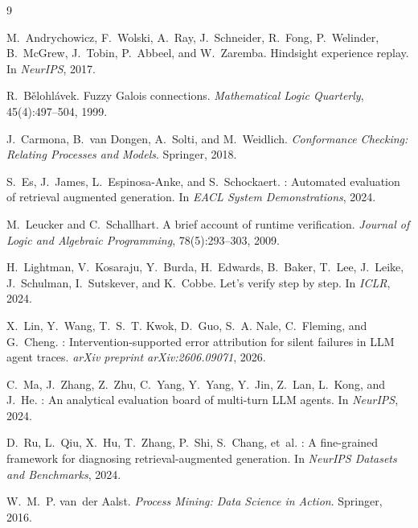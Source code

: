 \documentclass{article}
\begin{document}
{\small
\begin{thebibliography}{9}

M.~Andrychowicz, F.~Wolski, A.~Ray, J.~Schneider, R.~Fong, P.~Welinder, B.~McGrew, J.~Tobin, P.~Abbeel, and W.~Zaremba.
\newblock Hindsight experience replay.
\newblock In \emph{NeurIPS}, 2017.

R.~B\v{e}lohl\'avek.
\newblock Fuzzy Galois connections.
\newblock \emph{Mathematical Logic Quarterly}, 45(4):497--504, 1999.

J.~Carmona, B.~van Dongen, A.~Solti, and M.~Weidlich.
\newblock \emph{Conformance Checking: Relating Processes and Models}.
\newblock Springer, 2018.

S.~Es, J.~James, L.~Espinosa-Anke, and S.~Schockaert.
: Automated evaluation of retrieval augmented generation.
\newblock In \emph{EACL System Demonstrations}, 2024.

M.~Leucker and C.~Schallhart.
\newblock A brief account of runtime verification.
\newblock \emph{Journal of Logic and Algebraic Programming}, 78(5):293--303, 2009.

H.~Lightman, V.~Kosaraju, Y.~Burda, H.~Edwards, B.~Baker, T.~Lee, J.~Leike, J.~Schulman, I.~Sutskever, and K.~Cobbe.
\newblock Let's verify step by step.
\newblock In \emph{ICLR}, 2024.

X.~Lin, Y.~Wang, T.~S.~T. Kwok, D.~Guo, S.~A. Nale, C.~Fleming, and G.~Cheng.
: Intervention-supported error attribution for silent failures in {LLM} agent traces.
\newblock \emph{arXiv preprint arXiv:2606.09071}, 2026.

C.~Ma, J.~Zhang, Z.~Zhu, C.~Yang, Y.~Yang, Y.~Jin, Z.~Lan, L.~Kong, and J.~He.
: An analytical evaluation board of multi-turn {LLM} agents.
\newblock In \emph{NeurIPS}, 2024.

D.~Ru, L.~Qiu, X.~Hu, T.~Zhang, P.~Shi, S.~Chang, et~al.
: A fine-grained framework for diagnosing retrieval-augmented generation.
\newblock In \emph{NeurIPS Datasets and Benchmarks}, 2024.

W.~M.~P. van~der Aalst.
\newblock \emph{Process Mining: Data Science in Action}.
\newblock Springer, 2016.


\end{thebibliography}}
\end{document}
